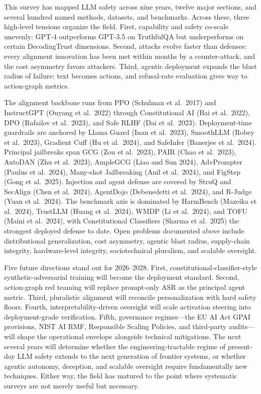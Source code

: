 This survey has mapped LLM safety across nine years, twelve major sections, and several hundred named methods, datasets, and benchmarks. Across these, three high-level tensions organize the field. First, capability and safety co-scale unevenly: GPT-4 outperforms GPT-3.5 on TruthfulQA but underperforms on certain DecodingTrust dimensions. Second, attacks evolve faster than defenses: every alignment innovation has been met within months by a counter-attack, and the cost asymmetry favors attackers. Third, agentic deployment expands the blast radius of failure: text becomes actions, and refusal-rate evaluation gives way to action-graph metrics.

The alignment backbone runs from PPO (Schulman et al.~2017) and InstructGPT (Ouyang et al.~2022) through Constitutional AI (Bai et al.~2022), DPO (Rafailov et al.~2023), and Safe RLHF (Dai et al.~2023). Deployment-time guardrails are anchored by Llama Guard (Inan et al.~2023), SmoothLLM (Robey et al.~2023), Gradient Cuff (Hu et al.~2024), and SafeInfer (Banerjee et al.~2024). Principal jailbreaks span GCG (Zou et al.~2023), PAIR (Chao et al.~2023), AutoDAN (Zhu et al.~2023), AmpleGCG (Liao and Sun 2024), AdvPrompter (Paulus et al.~2024), Many-shot Jailbreaking (Anil et al.~2024), and FigStep (Gong et al.~2025). Injection and agent defense are covered by StruQ and SecAlign (Chen et al.~2024), AgentDojo (Debenedetti et al.~2024), and R-Judge (Yuan et al.~2024). The benchmark axis is dominated by HarmBench (Mazeika et al.~2024), TrustLLM (Huang et al.~2024), WMDP (Li et al.~2024), and TOFU (Maini et al.~2024), with Constitutional Classifiers (Sharma et al.~2025) the strongest deployed defense to date. Open problems documented above include distributional generalization, cost asymmetry, agentic blast radius, supply-chain integrity, hardware-level integrity, sociotechnical pluralism, and scalable oversight.

Five future directions stand out for 2026--2028. First, constitutional-classifier-style synthetic-adversarial training will become the deployment standard. Second, action-graph red teaming will replace prompt-only ASR as the principal agent metric. Third, pluralistic alignment will reconcile personalization with hard safety floors. Fourth, interpretability-driven oversight will scale activation steering into deployment-grade verification. Fifth, governance regimes---the EU AI Act GPAI provisions, NIST AI RMF, Responsible Scaling Policies, and third-party audits---will shape the operational envelope alongside technical mitigations. The next several years will determine whether the engineering-tractable regime of present-day LLM safety extends to the next generation of frontier systems, or whether agentic autonomy, deception, and scalable oversight require fundamentally new techniques. Either way, the field has matured to the point where systematic surveys are not merely useful but necessary.

